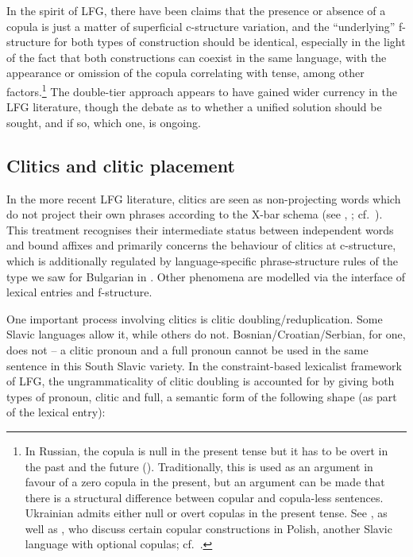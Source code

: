 \documentclass[output=paper,hidelinks]{langscibook}
\begin{document}
\largerpage
In the spirit of LFG, there have been claims that the presence or absence of a copula is just a matter of superficial c-structure variation, and the ``underlying'' f-structure for both types of construction should be identical, especially in the light of the fact that both constructions can coexist in the same language, with the appearance or omission of the copula correlating with tense, among other factors.\footnote{In Russian, the copula is null in the present tense but it has to be overt in the past and the future (\citealt[191--192]{dalrympleetal04copular}). Traditionally, this is used as an argument in favour of a zero copula in the present, but an argument can be made that there is a structural difference between copular and copula-less sentences. Ukrainian admits either null or overt copulas in the present tense. See , as well as \citet{PatejukPrzepiorkowski2014b,PatejukPrzepiorkowski2018}, who discuss certain copular constructions in Polish, another Slavic language with optional copulas; cf.\ \citet[195--197]{DLM:LFG}.} The double-tier approach appears to have gained wider currency in the LFG literature, though the debate as to whether a unified solution should be sought, and if so, which one, is ongoing.

\largerpage
\subsection{Clitics and clitic placement}
\label{sec:Slavic:2.8}

In the more recent LFG literature, clitics are seen as non-projecting words which do not project their own phrases according to the X-bar schema (see \citealt{JaegerGerassimova2002}, \citealt[116--117]{BresnanEtAl2016}; cf.\ ). This treatment recognises their intermediate status between independent words and bound affixes and primarily concerns the behaviour of clitics at c-structure, which is additionally regulated by language-specific phrase-structure rules of the type we saw for Bulgarian in . Other phenomena are modelled via the interface of lexical entries and f-structure.

One important process involving clitics is clitic doubling/reduplication. Some Slavic languages allow it, while others do not. Bosnian/Croatian/Serbian, for one, does not -- a clitic pronoun and a full pronoun cannot be used in the same sentence in this South Slavic variety. In the constraint-based lexicalist framework of LFG, the ungrammaticality of clitic doubling is accounted for by giving both types of pronoun, clitic and full, a semantic form of the following shape (as part of the lexical entry):
\end{document}
